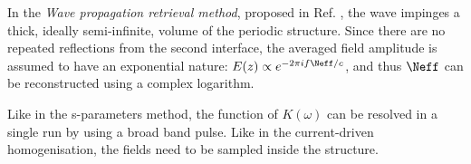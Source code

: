 In the \textit{Wave propagation retrieval method}, proposed in Ref. \cite{andryieuski2010homogenization},
the wave impinges a thick, ideally semi-infinite, volume of the periodic structure. Since there are no repeated reflections from the second interface, the averaged field amplitude is assumed to have an exponential nature: $E(z) \propto e^{-2\pi i f \Neff/c}$, and thus $\Neff$ can be reconstructed using a complex logarithm.

Like in the s-parameters method, the function of $K(\omega)$ can be resolved in a single run by using a broad band pulse. Like in the current-driven homogenisation,  the fields need to be sampled inside the structure. 



